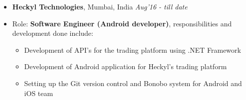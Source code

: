 \begin{itemize}
	\item \textbf{Heckyl Technologies}, Mumbai, India \hfill \emph{Aug'16 - till date}
	\item Role: \textbf{Software Engineer (Android developer)}, responsibilities and development done include: \\[-0.5cm]
	\begin{itemize}
		\item Development of API's for the trading platform using .NET Framework \\[-0.5cm]
		\item Development of Android application for Heckyl's trading platform \\[-0.5cm]
		\item Setting up the Git version control and Bonobo system for Android and iOS team
	\end{itemize}
\end{itemize}